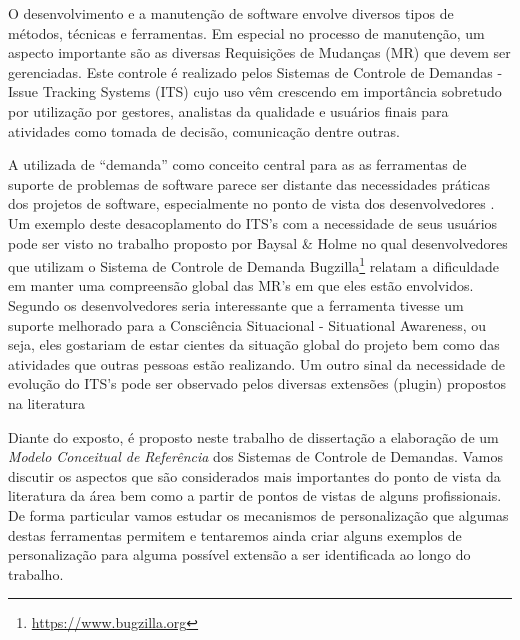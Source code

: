 \documentclass[msc,proposal,hidelot,hideabstract]{ppgccufmg} %
\begin{document}
O desenvolvimento e a manutenção de software envolve diversos tipos de métodos,
técnicas e ferramentas. Em especial no processo de manutenção, um aspecto
importante são as diversas Requisições de Mudanças (MR) que devem ser
gerenciadas. Este controle é realizado pelos Sistemas de Controle de Demandas -
Issue Tracking Systems (ITS) cujo uso vêm crescendo em importância sobretudo
por utilização por gestores, analistas da qualidade e usuários finais para
atividades como tomada de decisão, comunicação dentre outras.

A utilizada de  ``demanda'' como conceito central para as as ferramentas de
suporte de problemas de software parece ser distante das necessidades práticas dos projetos de software, especialmente
no ponto de vista dos desenvolvedores \cite{Baysal:2013:SAP:2486788.2486957}. Um exemplo deste desacoplamento do
ITS's com a necessidade de seus usuários pode ser visto no trabalho proposto por Baysal \& Holme \cite{baysal2012qualitative} no qual desenvolvedores que utilizam o Sistema de
Controle de Demanda Bugzilla\footnote{\url{https://www.bugzilla.org}} relatam a
dificuldade em manter uma compreensão global das MR's em que eles estão
envolvidos. Segundo os desenvolvedores seria interessante que a ferramenta
tivesse um suporte melhorado para a Consciência Situacional - Situational
Awareness, ou seja, eles gostariam de estar cientes da situação global do
projeto bem como das atividades que outras pessoas estão realizando. Um outro
sinal da necessidade de evolução do ITS's pode ser observado pelos diversas extensões (plugin) propostos na literatura \cite{101186,Thung:2014:BIT:2635868.2661678,Kononenko:2014:DED:2591062.2591075}

Diante do exposto, é proposto neste  trabalho de dissertação a elaboração de um
\textit{Modelo Conceitual de Referência} dos Sistemas de Controle de Demandas. Vamos discutir os aspectos que são
considerados mais importantes do ponto de vista da literatura da área bem como
a partir de pontos de vistas de alguns profissionais. De forma particular vamos
estudar os mecanismos de personalização que algumas destas ferramentas permitem
e tentaremos ainda criar alguns exemplos de personalização para alguma possível
extensão a ser identificada ao longo do trabalho.
\end{document}
